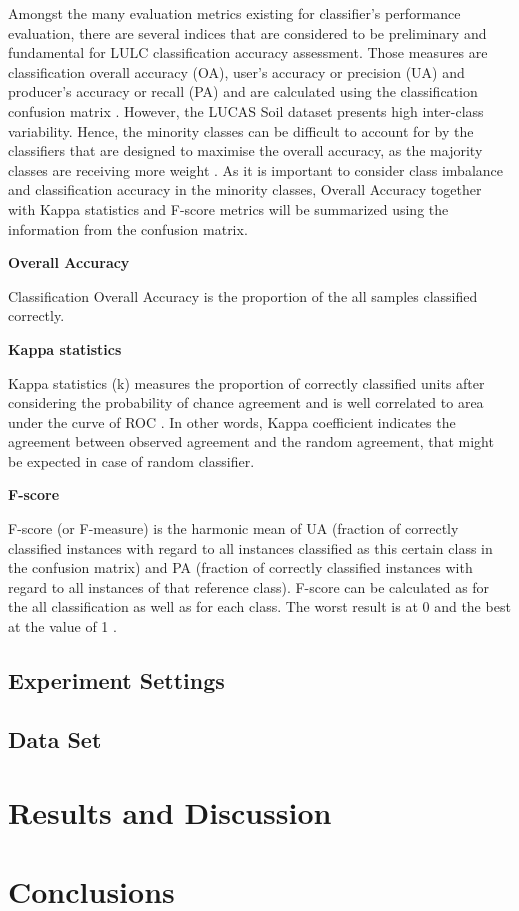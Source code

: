 \documentclass[parskip=full]{scrartcl}
\begin{document}
Amongst the many evaluation metrics existing for classifier's performance
evaluation, there are several indices that are considered to be preliminary and
fundamental for LULC classification accuracy assessment. Those measures are
classification overall accuracy (OA), user's accuracy or precision (UA) and
producer's accuracy or recall (PA) and are calculated using the classification
confusion matrix \cite{Liu2007}. However, the LUCAS Soil dataset presents high
inter-class variability. Hence, the minority classes can be difficult to
account for by the classifiers that are designed to maximise the overall
accuracy, as the majority classes are receiving more weight \cite{Inglada2017}.
As it is important to consider class imbalance and classification accuracy in
the minority classes, Overall Accuracy together with Kappa statistics and
F-score metrics will be summarized using the information from the confusion
matrix.

\textbf{Overall Accuracy}

Classification Overall Accuracy is the proportion of the all samples classified
correctly.

\textbf{Kappa statistics}

Kappa statistics (k) measures the proportion of correctly classified units after
considering the probability of chance agreement and is well correlated to area
under the curve of ROC \cite{Freeman2012}. In other words, Kappa coefficient
indicates the agreement between observed agreement and the random agreement,
that might be expected in case of random classifier.

\textbf{F-score}

F-score (or F-measure) is the harmonic mean of UA (fraction of correctly
classified instances with regard to all instances classified as this certain
class in the confusion matrix) and PA (fraction of correctly classified
instances with regard to all instances of that reference class). F-score can be
calculated as for the all classification as well as for each class. The worst
result is at 0 and the best at the value of 1 \cite{Inglada2017}.

\subsection{Experiment Settings}

\subsection{Data Set}

\section{Results and Discussion}

\section{Conclusions}





\end{document}
